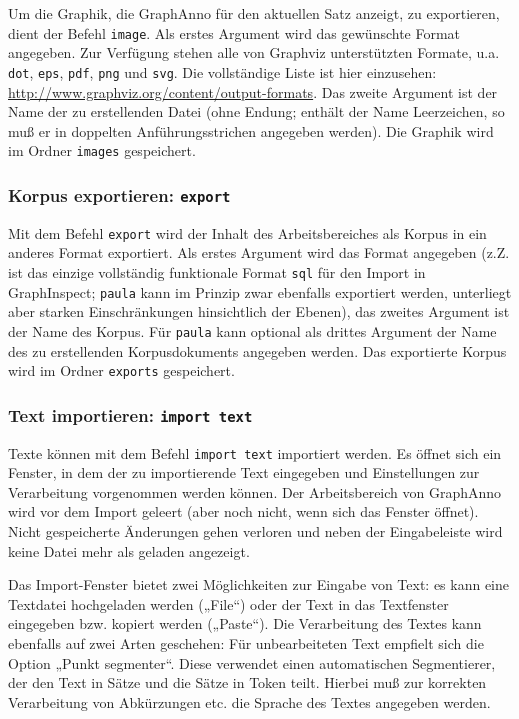 \documentclass[12pt]{scrartcl}
\begin{document}
Um die Graphik, die GraphAnno für den aktuellen Satz anzeigt, zu exportieren, dient der Befehl \texttt{image}. Als erstes Argument wird das gewünschte Format angegeben. Zur Verfügung stehen alle von Graphviz unterstützten Formate, u.a. \texttt{dot}, \texttt{eps}, \texttt{pdf}, \texttt{png} und \texttt{svg}. Die vollständige Liste ist hier einzusehen: \url{http://www.graphviz.org/content/output-formats}. Das zweite Argument ist der Name der zu erstellenden Datei (ohne Endung; enthält der Name Leerzeichen, so muß er in doppelten Anführungsstrichen angegeben werden). Die Graphik wird im Ordner \texttt{images} gespeichert.


\subsubsection{Korpus exportieren: \texttt{export}}\label{befehl-export}

Mit dem Befehl \texttt{export} wird der Inhalt des Arbeitsbereiches als Korpus in ein anderes Format exportiert. Als erstes Argument wird das Format angegeben (z.Z. ist das einzige vollständig funktionale Format \texttt{sql} für den Import in GraphInspect; \texttt{paula} kann im Prinzip zwar ebenfalls exportiert werden, unterliegt aber starken Einschränkungen hinsichtlich der Ebenen), das zweites Argument ist der Name des Korpus. Für \texttt{paula} kann optional als drittes Argument der Name des zu erstellenden Korpusdokuments angegeben werden. Das exportierte Korpus wird im Ordner \texttt{exports} gespeichert.


\subsubsection{Text importieren: \texttt{import text}}

Texte können mit dem Befehl \texttt{import text} importiert werden. Es öffnet sich ein Fenster, in dem der zu importierende Text eingegeben und Einstellungen zur Verarbeitung vorgenommen werden können.
Der Arbeitsbereich von GraphAnno wird vor dem Import geleert (aber noch nicht, wenn sich das Fenster öffnet). Nicht gespeicherte Änderungen gehen verloren und neben der Eingabeleiste wird keine Datei mehr als geladen angezeigt.

Das Import-Fenster bietet zwei Möglichkeiten zur Eingabe von Text: es kann eine Textdatei hochgeladen werden („File“) oder der Text in das Textfenster eingegeben bzw. kopiert werden („Paste“). Die Verarbeitung des Textes kann ebenfalls auf zwei Arten geschehen: Für unbearbeiteten Text empfielt sich die Option „Punkt segmenter“. Diese verwendet einen automatischen Segmentierer, der den Text in Sätze und die Sätze in Token teilt. Hierbei muß zur korrekten Verarbeitung von Abkürzungen etc. die Sprache des Textes angegeben werden.
\end{document}
